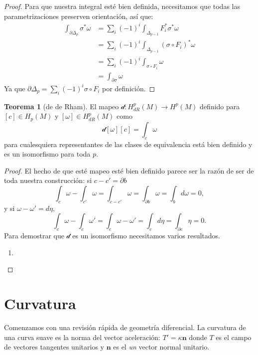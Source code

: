 \documentclass[spanish]{article}
\theoremstyle{definition}
\newtheorem*{teo}{Teorema}
\begin{document}
\begin{proof}
		

	
		
		Para que nuestra integral esté bien definida, necesitamos que todas las parametrizaciones preserven orientación, así que:
		\begin{align*}
			\int_{\partial\Delta_p}\sigma^*\omega&=\sum_i(-1)^i\int_{\Delta_{p-1}}F^*_{i}\sigma^*\omega\\
			&=\sum_i(-1)^i\int_{\Delta_{p-1}}(\sigma\circ F_{i})^*\omega\\
			&=\sum_i(-1)^i\int_{\sigma\circ F_i}\omega\\
			&=\int_{\partial\sigma}\omega
		\end{align*}
		Ya que  $\partial\Delta_p=\sum_i(-1)^i\sigma\circ F_{i}$ por definición.
	\end{proof}
	
	\begin{teo}[de de Rham]
		El  mapeo $\mathcal{d}:H^p_{dR}(M)\to H^p(M)$ definido para $[c]\in H_p(M)$ y $[\omega]\in H^p_{dR}(M)$ como
		\[\mathcal{d}[\omega][c]=\int_c\omega\]
		para cualesquiera representantes de las clases de equivalencia está bien definido y es un isomorfismo para toda $p$.
	\end{teo}
	\begin{proof}
		El hecho de que esté mapeo esté bien definido parece ser la razón de ser de toda nuestra construcción: si $c-c'=\partial b$
		\[\int_c\omega-\int_{c'}\omega=\int_{c-c'}\omega=\int_{\partial b}\omega=\int_bd\omega=0,\]
		y si $\omega-\omega'=d\eta$,
		\[\int_c\omega-\int_c\omega'=\int_c\omega-\omega'=\int_cd\eta=\int_{\partial c}\eta=0.\]
		Para demostrar que $\mathcal{d}$ es un isomorfismo necesitamos varios resultados.
		\begin{enumerate}
			\item 
		\end{enumerate}
	\end{proof}
	
	
	
	\iffalse
	\clearpage
	\section{Curvatura}
	Comenzamos con una revisión rápida de geometría diferencial. La curvatura de una curva suave es la norma del vector aceleración: $T'=\kappa\mathbf{n}$ donde $T$ es el campo de vectores tangentes unitarios y $\mathbf{n}$ es el \textit{un} vector normal unitario.
	
\end{document}
